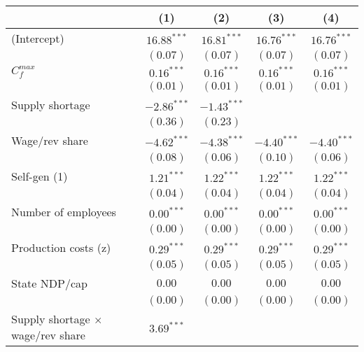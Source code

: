 
\begin{tabular}{l c c c c }
\toprule
 & (1) & (2) & (3) & (4) \\
\midrule
(Intercept)                               & $16.88^{***}$ & $16.81^{***}$ & $16.76^{***}$ & $16.76^{***}$ \\
                                          & $(0.07)$      & $(0.07)$      & $(0.07)$      & $(0.07)$      \\
$C^{max}_{f}$                             & $0.16^{***}$  & $0.16^{***}$  & $0.16^{***}$  & $0.16^{***}$  \\
                                          & $(0.01)$      & $(0.01)$      & $(0.01)$      & $(0.01)$      \\
Supply shortage                           & $-2.86^{***}$ & $-1.43^{***}$ &               &               \\
                                          & $(0.36)$      & $(0.23)$      &               &               \\
Wage/rev share                            & $-4.62^{***}$ & $-4.38^{***}$ & $-4.40^{***}$ & $-4.40^{***}$ \\
                                          & $(0.08)$      & $(0.06)$      & $(0.10)$      & $(0.06)$      \\
Self-gen (1)                              & $1.21^{***}$  & $1.22^{***}$  & $1.22^{***}$  & $1.22^{***}$  \\
                                          & $(0.04)$      & $(0.04)$      & $(0.04)$      & $(0.04)$      \\
Number of employees                       & $0.00^{***}$  & $0.00^{***}$  & $0.00^{***}$  & $0.00^{***}$  \\
                                          & $(0.00)$      & $(0.00)$      & $(0.00)$      & $(0.00)$      \\
Production costs (z)                      & $0.29^{***}$  & $0.29^{***}$  & $0.29^{***}$  & $0.29^{***}$  \\
                                          & $(0.05)$      & $(0.05)$      & $(0.05)$      & $(0.05)$      \\
State NDP/cap                             & $0.00$        & $0.00$        & $0.00$        & $0.00$        \\
                                          & $(0.00)$      & $(0.00)$      & $(0.00)$      & $(0.00)$      \\
Supply shortage $\times$ wage/rev share   & $3.69^{***}$  &               &               &               \\

\end{tabular}
